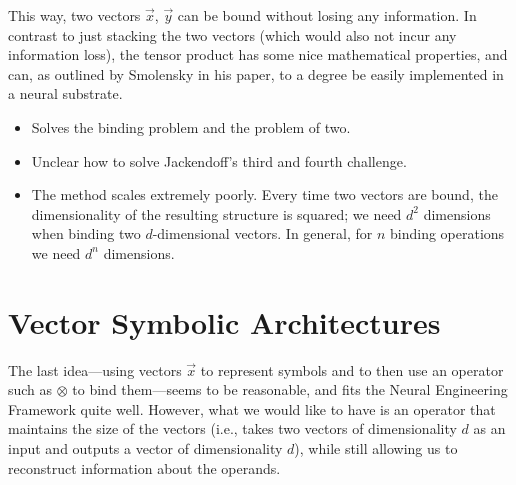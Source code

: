 \documentclass[10pt,letterpaper,oneside]{article}
\begin{document}
This way, two vectors $\vec x$, $\vec y$ can be bound without losing any information. In contrast to just stacking the two vectors (which would also not incur any information loss), the tensor product has some nice mathematical properties, and can, as outlined by Smolensky in his paper, to a degree be easily implemented in a neural substrate.
\begin{itemize}
	\item[\OPlus] Solves the binding problem and the problem of two.
	\item[\OMeh] Unclear how to solve Jackendoff's third and fourth challenge.
	\item[\OMinus] The method scales extremely poorly. Every time two vectors are bound, the dimensionality of the resulting structure is squared; we need $d^2$ dimensions when binding two $d$-dimensional vectors. In general, for $n$ binding operations we need $d^n$ dimensions.
\end{itemize}


\section{Vector Symbolic Architectures}

The last idea---using vectors $\vec x$ to represent symbols and to then use an operator such as $\otimes$ to bind them---seems to be reasonable, and fits the Neural Engineering Framework quite well. However, what we would like to have is an operator that maintains the size of the vectors (i.e., takes two vectors of dimensionality $d$ as an input and outputs a vector of dimensionality $d$), while still allowing us to reconstruct information about the operands.
\end{document}
